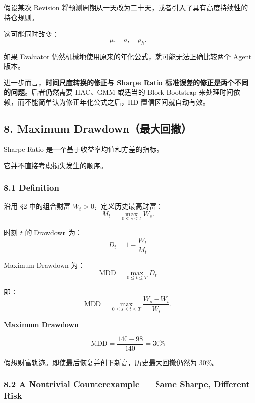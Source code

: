假设某次 Revision 将预测周期从一天改为二十天，或者引入了具有高度持续性的持仓规则。

这可能同时改变：
\[\mu,\quad\sigma,\quad\rho_h.\]

如果 Evaluator 仍然机械地使用原来的年化公式，就可能无法正确比较两个 Agent 版本。

进一步而言，\textbf{时间尺度转换的修正与 Sharpe Ratio 标准误差的修正是两个不同的问题}。后者仍然需要 HAC、GMM 或适当的 Block Bootstrap 来处理时间依赖，而不能简单认为修正年化公式之后，IID 置信区间就自动有效。

\hypertarget{part-4-67-0001-maximum-drawdownux6700ux5927ux56deux64a4}{%
\subsection{8. Maximum Drawdown（最大回撤）}\label{part-4-67-0001-maximum-drawdownux6700ux5927ux56deux64a4}}

Sharpe Ratio 是一个基于收益率均值和方差的指标。

它并不直接考虑损失发生的顺序。

\hypertarget{part-4-67-0001-definition-1}{%
\subsubsection{8.1 Definition}\label{part-4-67-0001-definition-1}}

沿用 §2 中的组合财富 \(W_t>0\)，定义历史最高财富：
\[M_t=\max_{0\leq s\leq t}W_s.\]

时刻 \(t\) 的 Drawdown 为：
\[\boxed{
D_t=1-\frac{W_t}{M_t}
}\]

Maximum Drawdown 为：
\[\boxed{
\mathrm{MDD}
=
\max_{0\leq t\leq T}D_t
}\]

即：
\[\mathrm{MDD}
=
\max_{0\leq s\leq t\leq T}
\frac{W_s-W_t}{W_s}.\]

\textbf{Maximum Drawdown}


\[\mathrm{MDD}=\frac{140-98}{140}=30\%\]

假想财富轨迹。即使最后恢复并创下新高，历史最大回撤仍然为 30\%。

\hypertarget{part-4-67-0001-a-nontrivial-counterexample-same-sharpe-different-risk}{%
\subsubsection{8.2 A Nontrivial Counterexample --- Same Sharpe, Different Risk}\label{part-4-67-0001-a-nontrivial-counterexample-same-sharpe-different-risk}}

